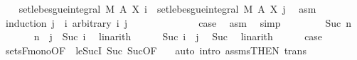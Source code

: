 \begin{isabellebody}
\ \ \isamarkupfalse%
\ {\isachardoublequoteopen}set{\isacharunderscore}{\kern0pt}lebesgue{\isacharunderscore}{\kern0pt}integral\ M\ A\ {\isacharparenleft}{\kern0pt}X\ i{\isacharparenright}{\kern0pt}\ {\isacharequal}{\kern0pt}\ set{\isacharunderscore}{\kern0pt}lebesgue{\isacharunderscore}{\kern0pt}integral\ M\ A\ {\isacharparenleft}{\kern0pt}X\ j{\isacharparenright}{\kern0pt}{\isachardoublequoteclose}\ \isamarkupfalse%
\ asm\isanewline
\ \ \isamarkupfalse%
\ {\isacharparenleft}{\kern0pt}induction\ {\isachardoublequoteopen}j\ {\isacharminus}{\kern0pt}\ i{\isachardoublequoteclose}\ arbitrary{\isacharcolon}{\kern0pt}\ i\ j{\isacharparenright}{\kern0pt}\isanewline
\ \ \ \ \isamarkupfalse%
\ {}\isanewline
\ \ \ \ \isamarkupfalse%
\ \isamarkupfalse%
\ {\isacharquery}{\kern0pt}case\ \isamarkupfalse%
\ asm\ \isamarkupfalse%
\ simp\isanewline
\ \ \isamarkupfalse%
\isanewline
\ \ \ \ \isamarkupfalse%
\ {\isacharparenleft}{\kern0pt}Suc\ n{\isacharparenright}{\kern0pt}\isanewline
\ \ \ \ \isamarkupfalse%
\ {\isacharasterisk}{\kern0pt}{\isacharcolon}{\kern0pt}\ {\isachardoublequoteopen}n\ {\isacharequal}{\kern0pt}\ j\ {\isacharminus}{\kern0pt}\ Suc\ i{\isachardoublequoteclose}\ \isamarkupfalse%
\ linarith\isanewline
\ \ \ \ \isamarkupfalse%
\ {\isachardoublequoteopen}Suc\ i\ {\isasymle}\ j{\isachardoublequoteclose}\ \isamarkupfalse%
\ Suc{\isacharparenleft}{\kern0pt}{}{\isacharcomma}{\kern0pt}{}{\isacharparenright}{\kern0pt}\ \isamarkupfalse%
\ linarith\isanewline
\ \ \ \ \isamarkupfalse%
\ {\isacharquery}{\kern0pt}case\ \isamarkupfalse%
\ sets{\isacharunderscore}{\kern0pt}F{\isacharunderscore}{\kern0pt}mono{\isacharbrackleft}{\kern0pt}OF\ {\isacharunderscore}{\kern0pt}\ le{\isacharunderscore}{\kern0pt}SucI{\isacharbrackright}{\kern0pt}\ Suc{\isacharparenleft}{\kern0pt}{}{\isacharparenright}{\kern0pt}\ Suc{\isacharparenleft}{\kern0pt}{}{\isacharparenright}{\kern0pt}{\isacharbrackleft}{\kern0pt}OF\ {\isacharasterisk}{\kern0pt}{\isacharbrackright}{\kern0pt}\ \isamarkupfalse%
\ {\isacharparenleft}{\kern0pt}auto\ intro{\isacharcolon}{\kern0pt}\ assms{\isacharparenleft}{\kern0pt}{}{\isacharparenright}{\kern0pt}{\isacharbrackleft}{\kern0pt}THEN\ trans{\isacharbrackright}{\kern0pt}{\isacharparenright}{\kern0pt}\isanewline

\end{isabellebody}
